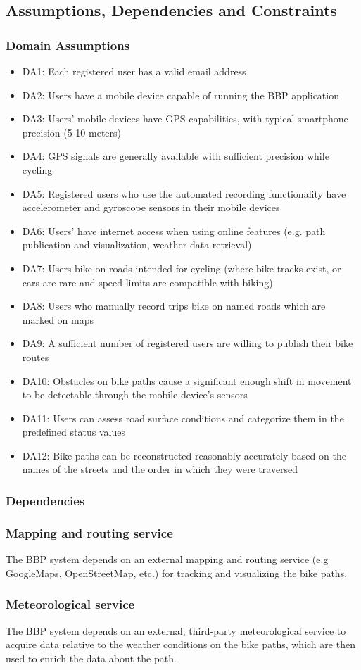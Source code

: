 \subsection{Assumptions, Dependencies and Constraints}
\subsubsection{Domain Assumptions}
\begin{itemize}
    \item DA1: Each registered user has a valid email address
    \item DA2: Users have a mobile device capable of running the BBP application
    \item DA3: Users' mobile devices have GPS capabilities, with typical smartphone precision (5-10 meters)
    \item DA4: GPS signals are generally available with sufficient precision while cycling
    \item DA5: Registered users who use the automated recording functionality have accelerometer and gyroscope sensors in their mobile devices
    \item DA6: Users' have internet access when using online features (e.g. path publication and visualization, weather data retrieval)
    \item DA7: Users bike on roads intended for cycling (where bike tracks exist, or cars are rare and speed limits are compatible with biking)
    \item DA8: Users who manually record trips bike on named roads which are marked on maps
    \item DA9: A sufficient number of registered users are willing to publish their bike routes
    \item DA10: Obstacles on bike paths cause a significant enough shift in movement to be detectable through the mobile device's sensors
    \item DA11: Users can assess road surface conditions and categorize them in the predefined status values
    \item DA12: Bike paths can be reconstructed reasonably accurately based on the names of the streets and the order in which they were traversed
\end{itemize}

\subsubsection{Dependencies}
\subsubsection*{Mapping and routing service}
The BBP system depends on an external mapping and routing service (e.g GoogleMaps, OpenStreetMap, etc.) for tracking and visualizing the bike paths.
\subsubsection*{Meteorological service}
The BBP system depends on an external, third-party meteorological service to acquire data relative to the weather conditions on the bike paths, which are then used to enrich the data about the path.
